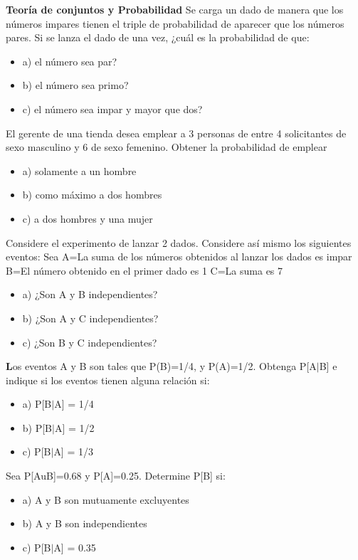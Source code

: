 \documentclass{../oxmathproblems}
\begin{document}
\begin{questions}

\miquestion \textbf{Teoría de conjuntos y Probabilidad} Se carga un dado de manera que los números impares tienen el triple de probabilidad de aparecer que  los números pares. Si se lanza el dado de una vez, ¿cuál es la probabilidad de que: 
\begin{itemize}
\item  a) el número sea par?
\item  b) el número sea primo?
\item  c) el número sea impar y mayor que dos?
\end{itemize}

\miquestion El gerente de una tienda desea emplear a 3 personas de entre 4 solicitantes de sexo masculino y 6 de sexo femenino. Obtener la probabilidad de emplear 
\begin{itemize}
\item  a) solamente a un hombre
\item  b) como máximo a dos hombres
\item  c) a dos hombres y una  mujer
\end{itemize}

\miquestion Considere el experimento de lanzar 2 dados. Considere así mismo los siguientes eventos: Sea 
A={La suma de los números obtenidos al lanzar los dados es impar}
B={El número obtenido en el primer dado es 1}
C={La suma es 7}
\begin{itemize}
 \item a) ¿Son A y B independientes?
\item b) ¿Son A y C independientes?
\item c) ¿Son B y C independientes?
\end{itemize}
\miquestion \textbf Los eventos A y B son tales que P(B)=1/4, y P(A)=1/2. Obtenga P[A$\mid$B] e indique si los eventos tienen alguna relación si: 
\begin{itemize}
 \item a) P[B$\mid$A] = 1/4
 \item b) P[B$\mid$A] = 1/2
 \item  c) P[B$\mid$A] = 1/3
\end{itemize}

\miquestion Sea P[AuB]=0.68 y P[A]=0.25. Determine P[B] si:
\begin{itemize}
 \item a) A y B son mutuamente excluyentes 
 \item b) A y B son independientes
 \item  c) P[B$\mid$A] = 0.35 
\end{itemize}


\end{questions}
\end{document}
